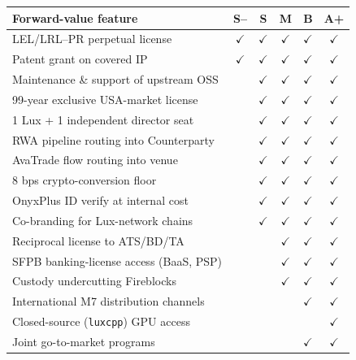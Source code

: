 \documentclass[11pt,letterpaper]{article}
\begin{document}
\begin{center}
\begin{small}
\begin{tabular}{p{6cm} ccccc}
\toprule
\textbf{Forward-value feature} & \textbf{S--} & \textbf{S} & \textbf{M} & \textbf{B} & \textbf{A+} \\
\midrule
LEL/LRL--PR perpetual license & $\checkmark$ & $\checkmark$ & $\checkmark$ & $\checkmark$ & $\checkmark$ \\
Patent grant on covered IP & $\checkmark$ & $\checkmark$ & $\checkmark$ & $\checkmark$ & $\checkmark$ \\
Maintenance \& support of upstream OSS & & $\checkmark$ & $\checkmark$ & $\checkmark$ & $\checkmark$ \\
99-year exclusive USA-market license & & $\checkmark$ & $\checkmark$ & $\checkmark$ & $\checkmark$ \\
1 Lux + 1 independent director seat & & $\checkmark$ & $\checkmark$ & $\checkmark$ & $\checkmark$ \\
RWA pipeline routing into Counterparty & & $\checkmark$ & $\checkmark$ & $\checkmark$ & $\checkmark$ \\
AvaTrade flow routing into venue & & $\checkmark$ & $\checkmark$ & $\checkmark$ & $\checkmark$ \\
8 bps crypto-conversion floor & & $\checkmark$ & $\checkmark$ & $\checkmark$ & $\checkmark$ \\
OnyxPlus ID verify at internal cost & & $\checkmark$ & $\checkmark$ & $\checkmark$ & $\checkmark$ \\
Co-branding for Lux-network chains & & $\checkmark$ & $\checkmark$ & $\checkmark$ & $\checkmark$ \\
Reciprocal license to ATS/BD/TA & & & $\checkmark$ & $\checkmark$ & $\checkmark$ \\
SFPB banking-license access (BaaS, PSP) & & & $\checkmark$ & $\checkmark$ & $\checkmark$ \\
Custody undercutting Fireblocks & & & $\checkmark$ & $\checkmark$ & $\checkmark$ \\
International M7 distribution channels & & & & $\checkmark$ & $\checkmark$ \\
Closed-source (\texttt{luxcpp}) GPU access & & & & & $\checkmark$ \\
Joint go-to-market programs & & & & $\checkmark$ & $\checkmark$ \\
\bottomrule
\end{tabular}
\end{small}
\end{center}
\end{document}
